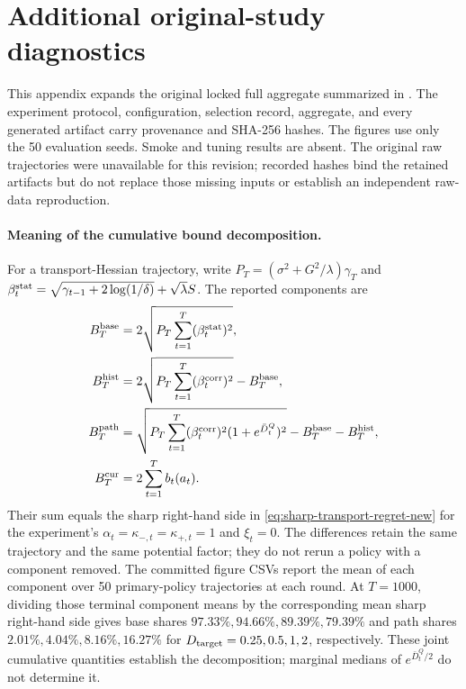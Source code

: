 \section{Additional original-study diagnostics}
\label{app:transport-instantiation}

This appendix expands the original locked full aggregate summarized in
.  The experiment protocol, configuration,
selection record, aggregate, and every generated artifact carry provenance and
SHA-256 hashes.  The figures use only the 50 evaluation seeds.  Smoke and tuning
results are absent.  The original raw trajectories were unavailable for this
revision; recorded hashes bind the retained artifacts but do not replace those
missing inputs or establish an independent raw-data reproduction.

\paragraph{Meaning of the cumulative bound decomposition.}
For a transport-Hessian trajectory, write
$P_T=(\sigma^2+G^2/\lambda)\gamma_T$ and
$\beta_t^{\rm stat}=\sqrt{\gamma_{t-1}+2\log(1/\delta)}+\sqrt\lambda S$.
The reported components are
\begin{align*}
 B_T^{\rm base}
 &=2\sqrt{P_T\sum_{t=1}^T(\beta_t^{\rm stat})^2},\\
 B_T^{\rm hist}
 &=2\sqrt{P_T\sum_{t=1}^T(\beta_t^{\rm corr})^2}-B_T^{\rm base},\\
 B_T^{\rm path}
 &=\sqrt{P_T\sum_{t=1}^T(\beta_t^{\rm corr})^2
       (1+e^{\bar D_t^Q})^2}-B_T^{\rm base}-B_T^{\rm hist},\\
 B_T^{\rm cur}&=2\sum_{t=1}^Tb_t(a_t).
\end{align*}
Their sum equals the sharp right-hand side in
\eqref{eq:sharp-transport-regret-new} for the experiment's
$\alpha_t=\kappa_{-,t}=\kappa_{+,t}=1$ and $\xi_t=0$.
The differences retain the same trajectory and the same potential factor;
they do not rerun a policy with a component removed.  The committed figure
CSVs report the mean of each component over 50 primary-policy trajectories
at each round.  At $T=1000$, dividing those terminal component means by the
corresponding mean sharp right-hand side gives base shares
$97.33\%,94.66\%,89.39\%,79.39\%$ and path shares
$2.01\%,4.04\%,8.16\%,16.27\%$ for
$D_{\rm target}=0.25,0.5,1,2$, respectively.
These joint cumulative quantities establish the decomposition;
marginal medians of $e^{\bar D_t^Q/2}$ do not determine it.

